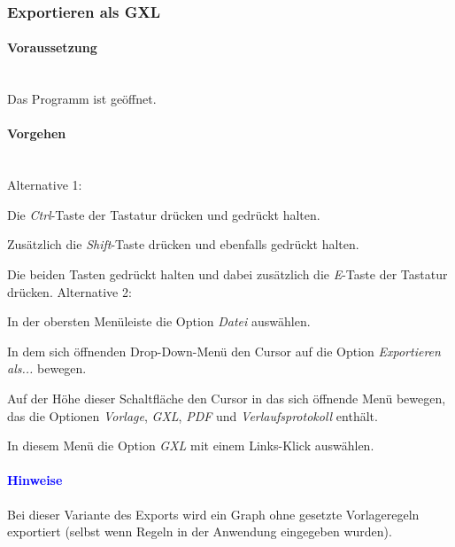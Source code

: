 \documentclass[enabledeprecatedfontcommands,fontsize=11pt,paper=a4,twoside]{scrartcl}
\newcounter{one}
\newcounter{two}[one]
\newcommand*{\hint}{\paragraph{\textcolor{blue}{Hinweise}}}
\newcommand*{\condition}{\paragraph{Voraussetzung}$\;$ \vspace{0.2cm}\\}
\newcommand*{\actions}{\paragraph{Vorgehen} $\;$\vspace{0.2cm}\\}
\newcommand*{\aOne}{\textcolor{bbe}{Alternative 1:}}
\newcommand*{\aTwo}{\textcolor{bbe}{Alternative 2:}}
\let\tempone\itemize
\let\temptwo\enditemize
\renewenvironment{itemize}{\tempone\addtolength{\itemsep}{-10.0pt}}{\temptwo}
\let\origenumerate\enumerate
\let\origendenumerate\endenumerate
\renewenvironment{enumerate}{\origenumerate \addtolength{\itemsep}{-10.0pt}}{\origendenumerate}
\begin{document}
\subsubsection{Exportieren als GXL}
		\condition 	
		Das Programm ist geöffnet.
		\actions
		\aOne
		\begin{enumerate}
				\item Die \textit{Ctrl}-Taste der Tastatur drücken und gedrückt halten.
				\item Zusätzlich die \textit{Shift}-Taste drücken und ebenfalls gedrückt halten.
				\item Die beiden Tasten gedrückt halten und dabei zusätzlich die \textit{E}-Taste der Tastatur drücken.
		\end{enumerate}				
		\aTwo
		\begin{enumerate}
				\item In der obersten Menüleiste die Option \textit{Datei} auswählen. 
				\item In dem sich öffnenden Drop-Down-Menü den Cursor auf die Option \textit{Exportieren als...} bewegen.
				\item Auf der Höhe dieser Schaltfläche den Cursor in das sich öffnende Menü bewegen, das die Optionen \textit{Vorlage}, \textit{GXL}, \textit{PDF} und \textit{Verlaufsprotokoll} enthält.
				\item In diesem Menü die Option \textit{GXL} mit einem Links-Klick auswählen.
		\end{enumerate}		
		\hint
		\begin{itemize}
				\item Bei dieser Variante des Exports wird ein Graph ohne gesetzte Vorlageregeln exportiert (selbst wenn Regeln in der Anwendung eingegeben wurden). \\
		\end{itemize}
		
\end{document}
